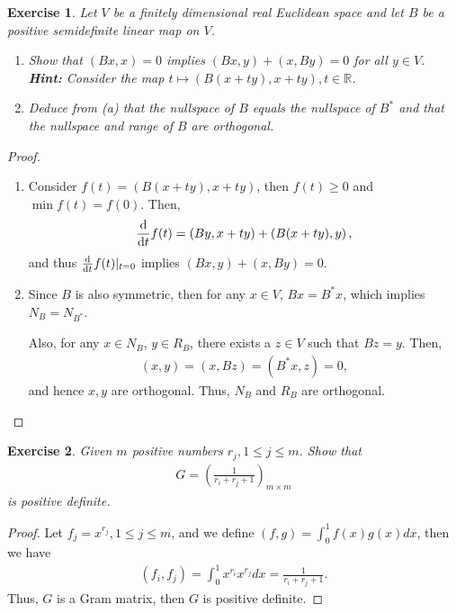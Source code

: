 \documentclass[10pt]{book}
\newtheorem{exercise}{Exercise}[section]
\theoremstyle{definition}
\numberwithin{equation}{chapter}
\begin{document}
\begin{exercise}
Let $V$ be a finitely dimensional real Euclidean space and let $B$ be a positive semidefinite linear map on $V$.
\begin{enumerate}[label=(\alph*)]
    \item Show that $(Bx, x) = 0$ implies $(Bx, y) + (x, By) = 0$ for all $y \in V$. {\bf Hint:} Consider the map $t \mapsto (B(x+ty), x+ty), t \in \mathbb{R}$.
    
    \item Deduce from (a) that the nullspace of $B$ equals the nullspace of $B^*$ and that the nullspace and range of $B$ are orthogonal.
\end{enumerate}
\end{exercise}
\begin{proof}
~\begin{enumerate}[label=(\alph*)]
    \item Consider $f(t) = (B(x+ty), x+ty)$, then $f(t) \geq 0$ and $\min f(t) = f(0)$. Then, 
    \begin{align*}
        \dv{}{t} f(t) = \left(By, x+ty\right) + \left(B(x+ty), y\right),
    \end{align*}
    and thus $\dv{}{t} f(t)|_{t=0}$ implies $(Bx, y) + (x, By) = 0$.
    
    \item Since $B$ is also symmetric, then for any $x \in V$, $Bx = B^*x$, which implies $N_B = N_{B^*}$.
    
    Also, for any $x \in N_B$, $y \in R_B$, there exists a $z \in V$ such that $Bz = y$. Then, 
    \begin{align*}
        (x,y) = (x, Bz) = (B^*x, z) = 0,
    \end{align*}
    and hence $x, y$ are orthogonal. Thus, $N_B$ and $R_B$ are orthogonal.
\end{enumerate}
\end{proof}

\medskip

\begin{exercise}
Given $m$ positive numbers $r_j, 1\leq j \leq m$. Show that 
\begin{align*}
    G = \left(\frac{1}{r_i + r_j + 1}\right)_{m\times m}
\end{align*}
is positive definite.
\end{exercise}
\begin{proof}
Let $f_j = x^{r_j}, 1\leq j \leq m$, and we define $(f,g) = \int^1_0 f(x)g(x)dx$, then we have 
\begin{align*}
    (f_i, f_j) = \int^1_0 x^{r_i}x^{r_j}dx = \frac{1}{r_i + r_j + 1}.
\end{align*}
Thus, $G$ is a Gram matrix, then $G$ is positive definite.
\end{proof}
\end{document}
